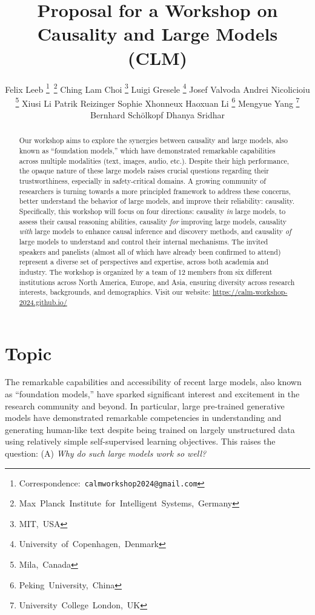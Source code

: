 \documentclass{article}
\title{Proposal for a Workshop on \\
Causality and Large Models (C\emoji{heart}LM)}
\author{%
    Felix Leeb \mbox{\thanks{Correspondence: \texttt{calmworkshop2024@gmail.com}} 
    \thanks{Max Planck Institute for Intelligent Systems, Germany}}
    \And
    Ching Lam Choi  \mbox{\footnotemark[1] \thanks{MIT, USA}}
    \And
    Luigi Gresele \mbox{\thanks{University of Copenhagen, Denmark}}
    \And
    Josef Valvoda \mbox{\footnotemark[4]}
    \And
    Andrei Nicolicioiu \mbox{\thanks{Mila, Canada}}
    \And
    Xiusi Li \mbox{\footnotemark[5]}
    \And
    Patrik Reizinger \mbox{\footnotemark[2]}
    \And
    Sophie Xhonneux \mbox{\footnotemark[5]}
    \And
    Haoxuan Li \mbox{\thanks{Peking University, China}}
    \And
    Mengyue Yang \mbox{\thanks{University College London, UK}}
    \And
    Bernhard Schölkopf \mbox{\footnotemark[2]}
    \And
    Dhanya Sridhar \mbox{\footnotemark[5]}
}
\begin{document}
\maketitle


\begin{abstract}
Our workshop aims to explore the synergies between causality and large models, also known as ``foundation models,'' which have demonstrated remarkable capabilities across multiple modalities (text, images, audio, etc.). Despite their high performance, the opaque nature of these large models raises crucial questions regarding their trustworthiness, especially in safety-critical domains. 
A growing community of researchers is turning towards a more principled framework to address these concerns, better understand the behavior of large models, and improve their reliability: causality.
Specifically, this workshop will focus on four directions: causality \textit{in} large models, to assess their causal reasoning abilities, causality \textit{for} improving large models, causality \textit{with} large models to enhance causal inference and discovery methods, and causality \textit{of} large models to understand and control their internal mechanisms. 
The invited speakers and panelists (almost all of which have already been confirmed to attend) represent a diverse set of perspectives and expertise, across both academia and industry.
The workshop is organized by a team of 12 members from six different institutions across North America, Europe, and Asia, ensuring diversity across research interests, backgrounds, and demographics. Visit our website: \url{https://calm-workshop-2024.github.io/}

\end{abstract}



\section{Topic}

The remarkable capabilities and accessibility of recent large models, also known as ``foundation models,'' have sparked significant interest and excitement in the research community and beyond. In particular, large pre-trained generative models have demonstrated remarkable competencies in understanding and generating human-like text despite being trained on largely unstructured data using relatively simple self-supervised learning objectives. This raises the question: (A) \textit{Why do such large models work so well?} %
\end{document}
